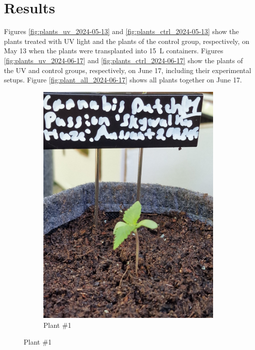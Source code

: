 \section{Results}

Figures \ref{fig:plants_uv_2024-05-13} and \ref{fig:plants_ctrl_2024-05-13} show the plants treated with UV light and the plants of the control group, respectively, on May 13 when the plants were transplanted into \qty[mode=text]{15}{\L} containers. Figures \ref{fig:plants_uv_2024-06-17} and \ref{fig:plants_ctrl_2024-06-17} show the plants of the UV and control groups, respectively, on June 17, including their experimental setups. Figure \ref{fig:plant_all_2024-06-17} shows all plants together on June 17.

\begin{figure}[H]
    \begin{subfigure}[t]{.19\textwidth}
        \includegraphics[width=\linewidth]{plant_01_2024-05-13}
        \caption{Plant \#1}
        \label{fig:plant_01_2024-05-13}

\end{subfigure}
\end{figure}
